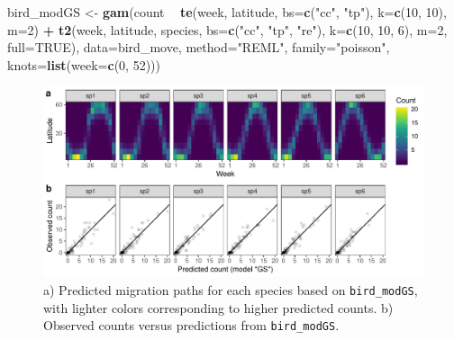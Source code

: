 \documentclass[12pt]{article}
\newenvironment{Shaded}{\begin{snugshade}}{\end{snugshade}}
\newcommand{\KeywordTok}[1]{\textcolor[rgb]{0.13,0.29,0.53}{\textbf{#1}}}
\newcommand{\DataTypeTok}[1]{\textcolor[rgb]{0.13,0.29,0.53}{#1}}
\newcommand{\DecValTok}[1]{\textcolor[rgb]{0.00,0.00,0.81}{#1}}
\newcommand{\StringTok}[1]{\textcolor[rgb]{0.31,0.60,0.02}{#1}}
\newcommand{\OtherTok}[1]{\textcolor[rgb]{0.56,0.35,0.01}{#1}}
\newcommand{\OperatorTok}[1]{\textcolor[rgb]{0.81,0.36,0.00}{\textbf{#1}}}
\newcommand{\NormalTok}[1]{#1}
\begin{document}
\begin{Shaded}
\begin{Highlighting}[]
\NormalTok{bird_modGS <-}\StringTok{ }\KeywordTok{gam}\NormalTok{(count }\OperatorTok{~}\StringTok{ }\KeywordTok{te}\NormalTok{(week, latitude, }\DataTypeTok{bs=}\KeywordTok{c}\NormalTok{(}\StringTok{"cc"}\NormalTok{, }\StringTok{"tp"}\NormalTok{),}
                             \DataTypeTok{k=}\KeywordTok{c}\NormalTok{(}\DecValTok{10}\NormalTok{, }\DecValTok{10}\NormalTok{), }\DataTypeTok{m=}\DecValTok{2}\NormalTok{) }\OperatorTok{+}
\StringTok{                    }\KeywordTok{t2}\NormalTok{(week, latitude, species, }\DataTypeTok{bs=}\KeywordTok{c}\NormalTok{(}\StringTok{"cc"}\NormalTok{, }\StringTok{"tp"}\NormalTok{, }\StringTok{"re"}\NormalTok{),}
                       \DataTypeTok{k=}\KeywordTok{c}\NormalTok{(}\DecValTok{10}\NormalTok{, }\DecValTok{10}\NormalTok{, }\DecValTok{6}\NormalTok{), }\DataTypeTok{m=}\DecValTok{2}\NormalTok{, }\DataTypeTok{full=}\OtherTok{TRUE}\NormalTok{),}
                  \DataTypeTok{data=}\NormalTok{bird_move, }\DataTypeTok{method=}\StringTok{"REML"}\NormalTok{, }\DataTypeTok{family=}\StringTok{"poisson"}\NormalTok{, }
                  \DataTypeTok{knots=}\KeywordTok{list}\NormalTok{(}\DataTypeTok{week=}\KeywordTok{c}\NormalTok{(}\DecValTok{0}\NormalTok{, }\DecValTok{52}\NormalTok{)))}
\end{Highlighting}
\end{Shaded}

\begin{figure}
\includegraphics[width=\linewidth]{../figures/Fig12} \caption{\label{fig:Fig12}a) Predicted migration paths for each species based on \texttt{bird\_modGS}, with lighter colors corresponding to higher predicted counts. b) Observed counts versus predictions from \texttt{bird\_modGS}.}\label{fig:Fig12}
\end{figure}
\end{document}
